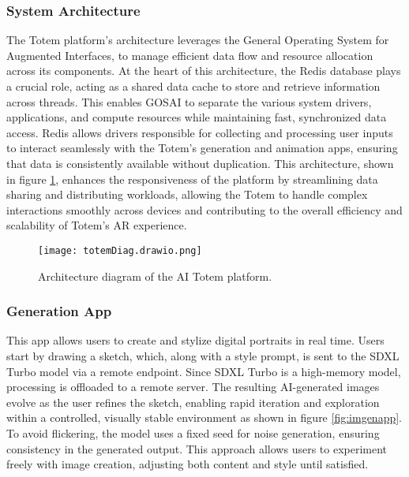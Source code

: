 \subsubsection{System Architecture}

The Totem platform's architecture leverages the General Operating System for Augmented Interfaces, to manage efficient data flow and resource allocation across its components.
At the heart of this architecture, the Redis\cite{carlson2013redis} database plays a crucial role, acting as a shared data cache to store and retrieve information across threads.
This enables GOSAI to separate the various system drivers, applications, and compute resources while maintaining fast, synchronized data access.
Redis allows drivers responsible for collecting and processing user inputs to interact seamlessly with the Totem’s generation and animation apps, ensuring that data is consistently available without duplication.
This architecture, shown in figure \ref{fig:diagtotem}, enhances the responsiveness of the platform by streamlining data sharing and distributing workloads, allowing the Totem to handle complex interactions smoothly across devices and contributing to the overall efficiency and scalability of Totem’s AR experience.

\begin{figure}[h!]
    \centering
    \texttt{[image: totemDiag.drawio.png]}
    \caption{Architecture diagram of the AI Totem platform.}
    \vspace{0.1cm}
    \label{fig:diagtotem}
\end{figure}

\subsubsection{ Generation App}

This app allows users to create and stylize digital portraits in real time.
Users start by drawing a sketch, which, along with a style prompt, is sent to the SDXL Turbo model via a remote endpoint.
Since SDXL Turbo is a high-memory model, processing is offloaded to a remote server.
The resulting AI-generated images evolve as the user refines the sketch, enabling rapid iteration and exploration within a controlled, visually stable environment as shown in figure \ref{fig:imgenapp}.
To avoid flickering, the model uses a fixed seed for noise generation, ensuring consistency in the generated output.
This approach allows users to experiment freely with image creation, adjusting both content and style until satisfied.

